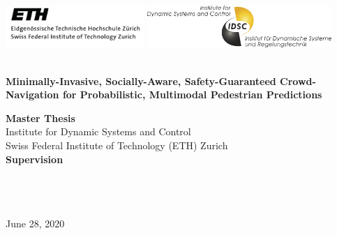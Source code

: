 \begin{titlepage}

\pagestyle{empty}
\begin{center}

\includegraphics[height=1.6cm]{logos/eth_logo}
\hfill
\includegraphics[height=1.6cm]{logos/idsc_logo}

\vspace*{2cm}
{\large \theauthor}
\vspace{2.5cm}

\begin{minipage}{15cm}
\centering
\bfseries \Huge {\thetitle} 
\\\vspace*{1cm}\Large {Minimally-Invasive, Socially-Aware, Safety-Guaranteed Crowd-Navigation for Probabilistic, Multimodal Pedestrian Predictions}
\end{minipage}
\vspace*{4cm}


{\large \textbf{Master Thesis}} \\[3ex]
Institute for Dynamic Systems and Control\\
Swiss Federal Institute of Technology (ETH) Zurich\\

\vspace{2cm}
\textbf{Supervision} \\[1.5ex]
\phdA \\
\phdB \\ 
\supervisorstanford \\ 
\supervisoreth

\vfill
June 28, 2020

\end{center}

\cleardoublepage %
\end{titlepage}
